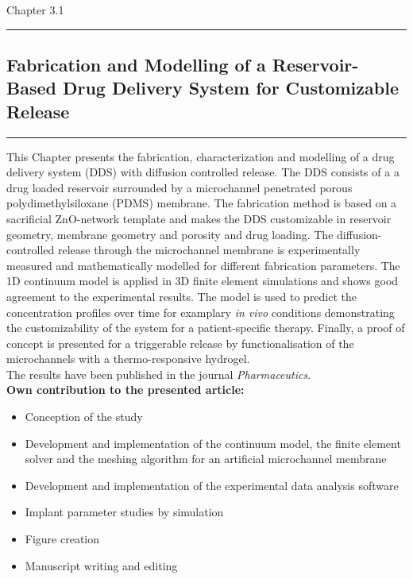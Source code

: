 \vspace{1cm}
\Large {Chapter 3.1}
\normalsize
\vspace{0.3cm}
\hrule
\subsection*{\Large \centering Fabrication and Modelling of a Reservoir-Based Drug Delivery
System for Customizable Release}
\vspace{0.3cm}
\hrule
\vspace{1.5cm}

This Chapter presents the fabrication, characterization and modelling of a drug delivery system (DDS) with diffusion controlled release. The DDS consists of a a drug loaded reservoir surrounded by a microchannel penetrated porous polydimethylsiloxane (PDMS) membrane. The fabrication method is based on a sacrificial ZnO-network template and makes the DDS customizable in reservoir geometry, membrane geometry and porosity and drug loading. The diffusion-controlled release through the microchannel membrane is experimentally measured and mathematically modelled for different fabrication parameters. The 1D continuum model is applied in 3D finite element simulations and shows good agreement to the experimental results. The model is used to predict the concentration profiles over time for examplary \textit{in vivo} conditions demonstrating the customizability of the system for a patient-specific therapy. Finally, a proof of concept is presented for a triggerable release by functionalisation of the microchannels with a thermo-responsive hydrogel. \\

The results have been published in the journal \textit{Pharmaceutics}.\\

\textbf{Own contribution to the presented article:}
\begin{itemize}
\item Conception of the study
\item Development and implementation of the continuum model, the finite element solver and the meshing algorithm for an artificial microchannel membrane
\item Development and implementation of the experimental data analysis software 
\item Implant parameter studies by simulation  
\item Figure creation 
\item Manuscript writing and editing
\end{itemize}

